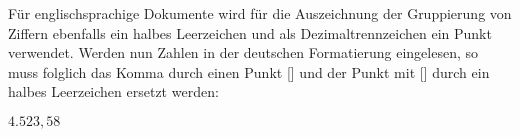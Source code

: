 \documentclass[english,ngerman]{tudscrartcl}
\begin{document}
\begin{Entity}{}
\begin{Trunk*}
\end{Trunk*}
%
Für englischsprachige Dokumente wird für die Auszeichnung der Gruppierung von 
Ziffern ebenfalls ein halbes Leerzeichen und als Dezimaltrennzeichen ein Punkt 
verwendet. Werden nun Zahlen in der deutschen Formatierung eingelesen, so muss 
folglich das Komma durch einen Punkt [] und der 
Punkt mit [\PParameter{\Macro*{,}}] durch ein halbes Leerzeichen 
ersetzt werden:%
%
\begin{Trunk*}
\begingroup
  \dotswap{\,}
  \(4.523,58\)
\endgroup
\end{Trunk*}
%
\FinishTutorial
\ListOfToDo
\end{Entity}
\end{document}
